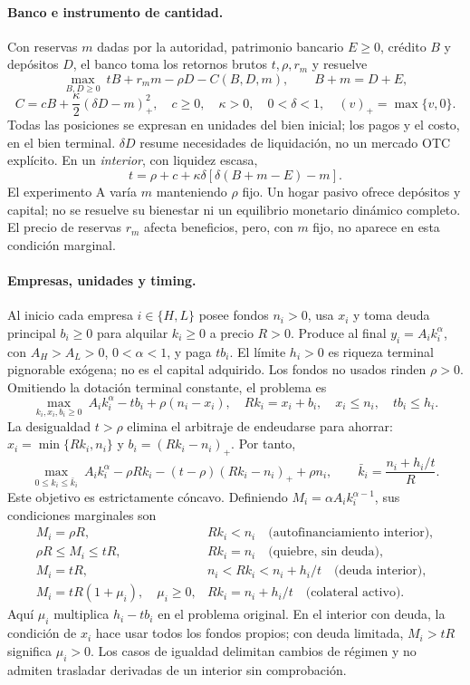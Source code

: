 \documentclass[11pt]{article}
\begin{document}
\paragraph{Banco e instrumento de cantidad.}
Con reservas $m$ dadas por la autoridad, patrimonio bancario $E\geq0$, cr\'edito
$B$ y dep\'ositos $D$, el banco toma los retornos brutos $t,\rho,r_m$ y resuelve
\[
 \max_{B,D\geq0}\ tB+r_m m-\rho D-C(B,D,m),\qquad B+m=D+E,
\]
\[
 C=cB+\frac{\kappa}{2}(\delta D-m)_+^2,\quad
 c\geq0,\quad\kappa>0,\quad0<\delta<1,\quad (v)_+=\max\{v,0\}.
\]
Todas las posiciones se expresan en unidades del bien inicial; los pagos y el
costo, en el bien terminal. $\delta D$ resume necesidades de liquidaci\'on,
no un mercado OTC expl\'icito. En un \mbox{\emph{interior}}, con liquidez escasa,
\[
 t=\rho+c+\kappa\delta[\delta(B+m-E)-m].
\]
\newpage
El experimento A var\'ia $m$ manteniendo $\rho$ fijo. Un hogar pasivo ofrece
dep\'ositos y capital; no se resuelve su bienestar ni un equilibrio monetario
din\'amico completo. El precio de reservas $r_m$ afecta beneficios, pero, con
$m$ fijo, no aparece en esta condici\'on marginal.

\paragraph{Empresas, unidades y timing.}
Al inicio cada empresa $i\in\{H,L\}$ posee fondos $n_i>0$, usa $x_i$ y toma
deuda principal $b_i\geq0$ para alquilar $k_i\geq0$ a precio $R>0$. Produce al
final $y_i=A_i k_i^\alpha$, con $A_H>A_L>0$, $0<\alpha<1$, y paga $tb_i$.
El l\'imite $h_i>0$ es riqueza terminal pignorable ex\'ogena; no es el capital
adquirido. Los fondos no usados rinden $\rho>0$. Omitiendo la dotaci\'on
terminal constante, el problema es
\begin{equation}\label{eq:firm}
 \max_{k_i,x_i,b_i\geq0}\ A_i k_i^\alpha-tb_i+\rho(n_i-x_i),
 \quad Rk_i=x_i+b_i,\quad x_i\leq n_i,\quad tb_i\leq h_i.
\end{equation}
La desigualdad $t>\rho$ elimina el arbitraje de endeudarse para ahorrar:
$x_i=\min\{Rk_i,n_i\}$ y $b_i=(Rk_i-n_i)_+$. Por tanto,
\[
 \max_{0\leq k_i\leq\bar k_i}\ A_i k_i^\alpha-\rho Rk_i
 -(t-\rho)(Rk_i-n_i)_+ +\rho n_i,
 \qquad\bar k_i=\frac{n_i+h_i/t}{R}.
\]
Este objetivo es estrictamente c\'oncavo. Definiendo
$M_i=\alpha A_i k_i^{\alpha-1}$, sus condiciones marginales son
\[
\begin{array}{ll}
 M_i=\rho R,& Rk_i<n_i \quad\text{(autofinanciamiento interior)},\\
 \rho R\leq M_i\leq tR,& Rk_i=n_i \quad\text{(quiebre, sin deuda)},\\
 M_i=tR,& n_i<Rk_i<n_i+h_i/t\quad\text{(deuda interior)},\\
 M_i=tR(1+\mu_i),\quad\mu_i\geq0,
 &Rk_i=n_i+h_i/t\quad\text{(colateral activo)}.
\end{array}
\]
Aqu\'i $\mu_i$ multiplica $h_i-tb_i$ en el problema original. En el interior
con deuda, la condici\'on de $x_i$ hace usar todos los fondos propios; con deuda
limitada, $M_i>tR$ significa $\mu_i>0$. Los casos de igualdad delimitan cambios
de r\'egimen y no admiten trasladar derivadas de un interior sin comprobaci\'on.
\end{document}
